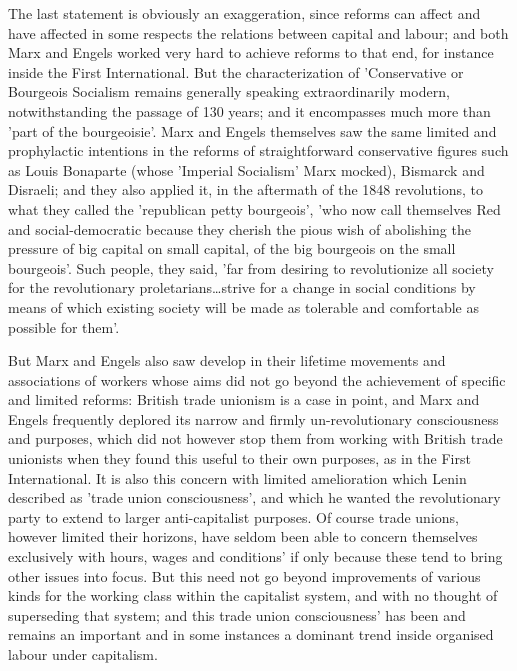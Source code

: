 The last statement is obviously an exaggeration, since reforms can affect and have affected in some respects the relations between capital and labour; and both Marx and Engels worked very hard to achieve reforms to that end, for instance inside the First International. But the characterization of 'Conservative or Bourgeois Socialism remains generally speaking extraordinarily modern, notwithstanding the passage of 130 years; and it encompasses much more than 'part of the bourgeoisie'. Marx and Engels themselves saw the same limited and prophylactic intentions in the reforms of straightforward conservative figures such as Louis Bonaparte (whose 'Imperial Socialism' Marx mocked), Bismarck and Disraeli; and they also applied it, in the aftermath of the 1848 revolutions, to what they called the 'republican petty bourgeois', 'who now call themselves Red and social-democratic because they cherish the pious wish of abolishing the pressure of big capital on small capital, of the big bourgeois on the small bourgeois'. Such people, they said, 'far from desiring to revolutionize all society for the revolutionary proletarians\dots strive for a change in social conditions by means of which existing society will be made as tolerable and comfortable as possible for them'.

But Marx and Engels also saw develop in their lifetime movements and associations of workers whose aims did not go beyond the achievement of specific and limited reforms: British trade unionism is a case in point, and Marx and Engels frequently deplored its narrow and firmly un\hyp{}revolutionary consciousness and purposes, which did not however stop them from working with British trade unionists when they found this useful to their own purposes, as in the First International. It is also this concern with limited amelioration which Lenin described as 'trade union consciousness', and which he wanted  the revolutionary party to extend to larger anti-capitalist purposes. Of course trade unions, however limited their horizons, have seldom been able to concern themselves exclusively with hours, wages and conditions' if only because these tend to bring other issues into focus. But this need not go beyond improvements of various kinds for the working class within the capitalist system, and with no thought of superseding that system; and this trade union consciousness' has been and remains an important and in some instances a dominant trend inside organised labour under capitalism.

